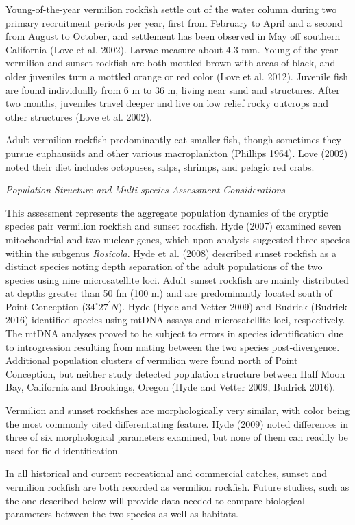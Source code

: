 \documentclass[
  english,
  a4paper,
]{article}
\begin{document}
Young-of-the-year vermilion rockfish settle out of the water column during two primary recruitment
periods per year, first from February to April and a second from August to October,
and settlement has been observed in May off southern California (Love et al. 2002). Larvae
measure about 4.3 mm. Young-of-the-year vermilion and sunset rockfish are both mottled
brown with areas of black, and older juveniles turn a mottled orange or red color (Love et al. 2012).
Juvenile fish are found individually from 6 m to 36 m, living near sand and structures.
After two months, juveniles travel deeper and live on low relief rocky outcrops and
other structures (Love et al. 2002).

Adult vermilion rockfish predominantly eat smaller fish, though sometimes they pursue
euphausiids and other various macroplankton (Phillips 1964). Love (2002) noted
their diet includes octopuses, salps, shrimps, and pelagic red crabs.

\emph{Population Structure and Multi-species Assessment Considerations}

This assessment represents the aggregate population dynamics of the cryptic species pair vermilion rockfish
and sunset rockfish.
Hyde (2007) examined seven mitochondrial and two nuclear genes, which upon analysis suggested
three species within the subgenus \emph{Rosicola}. Hyde et al. (2008) described sunset rockfish as a distinct species noting depth separation
of the adult populations of the two species using nine microsatellite loci.
Adult sunset rockfish are mainly distributed at depths
greater than 50 fm (100 m) and are predominantly located south of Point Conception ($34^\circ 27^\prime N$).
Hyde (Hyde and Vetter 2009) and Budrick (Budrick 2016) identified species using mtDNA assays and microsatellite loci,
respectively. The mtDNA analyses proved to be subject to errors in species identification due to introgression resulting from mating between the two species post-divergence.
Additional population clusters of vermilion were found north of Point Conception, but neither
study detected population structure between Half Moon Bay, California and Brookings,
Oregon (Hyde and Vetter 2009, Budrick 2016).

Vermilion and sunset rockfishes are morphologically very similar, with color being
the most commonly
cited differentiating feature. Hyde (2009) noted differences in three of six morphological
parameters examined, but none of them can readily be used for field identification.

In all historical and current recreational and commercial catches, sunset and
vermilion rockfish are both recorded as vermilion rockfish. Future studies,
such as the one described below will provide data needed to compare biological
parameters between the two species as well as habitats.
\end{document}

